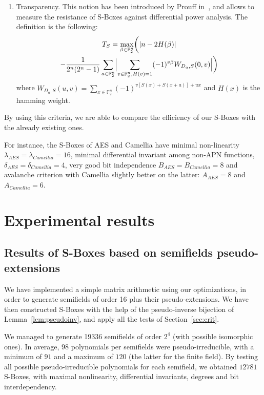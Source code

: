 \documentclass{article}\usepackage{amsthm}
\newcommand{\SBoxes}{S-Boxes\xspace}
\begin{document}
\begin{enumerate}
\item Transparency. This notion has been introduced by Prouff in~\cite{Prouff:2005:transparency}, and allows to measure the resistance of \SBoxes against differential power analysis. 
The definition is the following: 
\begin{multline*}
  T_S = \max_{\beta \in \mathbb{F}_2^n} \biggl(\left|n - 2H(\beta)\right|\\ - 
    \frac{1}{2^n(2^n-1)}\sum\limits_{a \in \mathbb{F}_2^n} \Bigl| \sum\limits_{v
        \in \mathbb{F}_2^n, H(v)=1}(-1)^{v\beta}W_{D_a,S}(0,v)\Bigr|\biggr)
\end{multline*}
 where $W_{D_a,S}(u,v) = \sum\limits_{x \in \mathbb{F}_2^n}(-1)^{v[S(x) +
   S(x+a)] + ux} $ and $H(x)$ is the hamming weight.
\end{enumerate}

By using this criteria, we are able to compare the efficiency of our \SBoxes with the already existing ones.

For instance, the \SBoxes of AES and Camellia have minimal non-linearity $\lambda_{AES}=\lambda_{Camellia}=16$, minimal
differential invariant among non-APN functions,
$\delta_{AES}=\delta_{Camellia}=4$, very good bit independence
$B_{AES}=B_{Camellia}=8$ and avalanche criterion with Camellia slightly better
on the latter: $A_{AES}=8$ and $A_{Camellia}=6$.


\section{Experimental results}\label{sec:expe}
\subsection{Results of \SBoxes based on semifields
  pseudo-extensions}

We have implemented a simple matrix arithmetic using our optimizations, in order
to generate semifields of order 16 plus their pseudo-extensions. We have then
constructed \SBoxes with the help of the pseudo-inverse bijection of
Lemma~\ref{lem:pseudoinv}, and apply all the tests of Section~\ref{sec:crit}. 

We managed to generate 19336 semifields of order $2^{4}$ (with possible isomorphic ones). 
In average, $98$ polynomials per semifields
were pseudo-irreducible, with a minimum of $91$ and a maximum of $120$ (the
latter for the finite field).
By testing all possible pseudo-irreducible polynomials for each semifield, we
obtained $12781$ \SBoxes, with maximal nonlinearity, differential invariants,
degrees and bit interdependency. 
\end{document}
